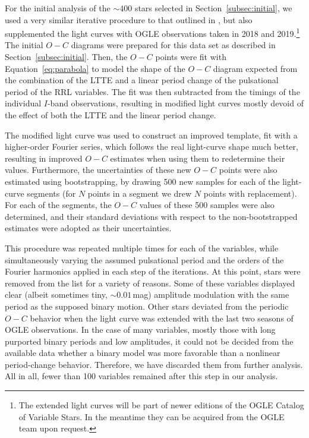 \documentclass[twocolumn,times]{aastex63}
\begin{document}
For the initial analysis of the $\sim400$ stars selected in Section~\ref{subsec:initial}, we used
a very similar iterative procedure to that outlined in \citet{2015MNRAS.449L.113H}, but also
supplemented the light curves with OGLE observations taken in 2018 and
2019.\footnote{The extended light curves will be part of newer editions of the OGLE Catalog of Variable
Stars. In the meantime they can be acquired from the OGLE team upon request.}
The initial $O-C$ diagrams were prepared for this data set as described in Section~\ref{subsec:initial}.
Then, the $O-C$ points were fit with Equation~\ref{eq:parabola} to
model the shape of the $O-C$ diagram expected from the combination of the LTTE and a linear period change of
the pulsational period of the RRL variables. The fit was then subtracted from the timings of the individual
$I$-band observations, resulting in modified light curves mostly devoid of the effect of both the LTTE and
the linear period change.

The modified light curve was used to construct an improved template, fit with a higher-order 
Fourier series, which follows the real light-curve shape much better, resulting in improved $O-C$ estimates
when using them to redetermine their values.
Furthermore, the uncertainties of these new $O-C$ points were also estimated using bootstrapping,
by drawing 500 new samples for each of the light-curve segments (for $N$ points in a segment we drew $N$ points
with replacement). For each of the segments, the $O-C$ values of these 500 samples were also determined,
and their standard deviations with respect to the non-bootstrapped estimates were adopted as their uncertainties.

This procedure was repeated multiple times for each of the variables, while simultaneously varying the
assumed pulsational period and the orders of the Fourier harmonics applied in each step of the iterations.
At this point, stars were removed from the list for a variety of reasons. Some of these variables displayed clear
(albeit sometimes tiny, $\sim0.01$\,mag) amplitude modulation with the same period as the supposed binary motion.
Other stars deviated from the periodic $O-C$ behavior when the light curve was extended with the last two seasons
of OGLE observations. In the case of many variables, mostly those with long purported binary periods and low amplitudes,
it could not be decided from the available data whether a binary model was more favorable than a nonlinear period-change
behavior. Therefore, we have discarded them from further analysis. All in all, fewer than 100 variables remained after this step in our analysis.
\end{document}
